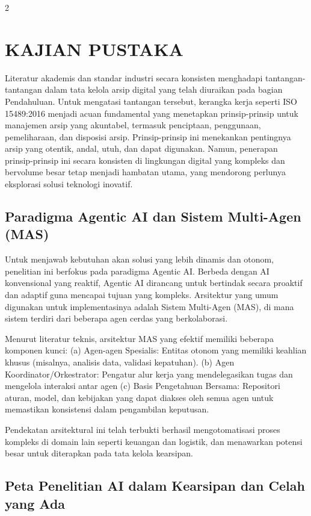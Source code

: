 \documentclass[12pt,a4paper]{article}
\begin{document}
\begin{multicols}{2}
\section{KAJIAN PUSTAKA}

Literatur akademis dan standar industri secara konsisten menghadapi tantangan-tantangan dalam tata kelola arsip digital yang telah diuraikan pada bagian Pendahuluan. Untuk mengatasi tantangan tersebut, kerangka kerja seperti ISO 15489:2016 menjadi acuan fundamental yang menetapkan prinsip-prinsip untuk manajemen arsip yang akuntabel, termasuk penciptaan, penggunaan, pemeliharaan, dan disposisi arsip. Prinsip-prinsip ini menekankan pentingnya arsip yang otentik, andal, utuh, dan dapat digunakan. Namun, penerapan prinsip-prinsip ini secara konsisten di lingkungan digital yang kompleks dan bervolume besar tetap menjadi hambatan utama, yang mendorong perlunya eksplorasi solusi teknologi inovatif.

\subsection{Paradigma Agentic AI dan Sistem Multi-Agen (MAS)}

Untuk menjawab kebutuhan akan solusi yang lebih dinamis dan otonom, penelitian ini berfokus pada paradigma Agentic AI. Berbeda dengan AI konvensional yang reaktif, Agentic AI dirancang untuk bertindak secara proaktif dan adaptif guna mencapai tujuan yang kompleks. Arsitektur yang umum digunakan untuk implementasinya adalah Sistem Multi-Agen (MAS), di mana sistem terdiri dari beberapa agen cerdas yang berkolaborasi.

Menurut literatur teknis, arsitektur MAS yang efektif memiliki beberapa komponen kunci: (a) Agen-agen Spesialis: Entitas otonom yang memiliki keahlian khusus (misalnya, analisis data, validasi kepatuhan). (b) Agen Koordinator/Orkestrator: Pengatur alur kerja yang mendelegasikan tugas dan mengelola interaksi antar agen (c) Basis Pengetahuan Bersama: Repositori aturan, model, dan kebijakan yang dapat diakses oleh semua agen untuk memastikan konsistensi dalam pengambilan keputusan.

Pendekatan arsitektural ini telah terbukti berhasil mengotomatisasi proses kompleks di domain lain seperti keuangan dan logistik, dan menawarkan potensi besar untuk diterapkan pada tata kelola kearsipan.

\subsection{Peta Penelitian AI dalam Kearsipan dan Celah yang Ada}


\end{multicols}
\end{document}
